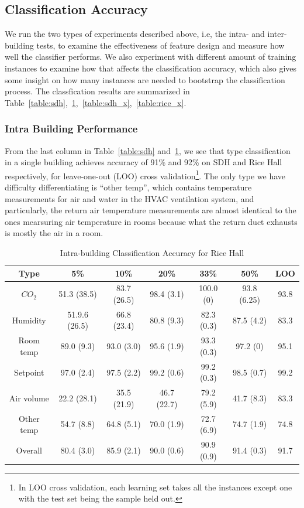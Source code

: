 \subsection{Classification Accuracy}
We run the two types of experiments described above, i.e, the intra- and inter- building tests, to examine the effectiveness of feature design and measure how well 
the classifier performs. We also experiment with different amount of training instances to examine how that affects the classification accuracy, which also gives 
some insight on how many instances are needed to bootstrap the classification process. The classfication results are summarized in Table~\ref{table:sdh},~\ref{table:rice},~\ref{table:sdh_x},~\ref{table:rice_x}.

\subsubsection{Intra Building Performance}
From the last column in Table~\ref{table:sdh} and~\ref{table:rice}, we see that type classification in a single building achieves accuracy of 91\% and 92\% on SDH and Rice Hall respectively, for leave-one-out (LOO) cross validation\footnote{In LOO cross validation, each learning set takes all the instances except one with the test set being the sample held out.}. The only type we have difficulty differentiating is ``other temp'', which contains temperature measurements for air and water in the HVAC ventilation system, and particularly, the return air temperature measurements are almost identical to the ones mearsuring air temperature in rooms because what the return duct exhausts is mostly the air in a room.

\begin{table}[ht!]
\caption{Intra-building Classification Accuracy for Rice Hall}
\centering %
\begin{tabular}{c | c | c | c | c | c | c}%
\hline %
Type & 5\% & 10\% & 20\% & 33\% & 50\% & LOO\\ %
\hline\hline %
$CO_{2}$ & 51.3 (38.5) & 83.7 (26.5) & 98.4 (3.1) & 100.0 (0) & 93.8 (6.25) & 93.8\\ \hline
Humidity & 51.9.6 (26.5) & 66.8 (23.4) & 80.8 (9.3) & 82.3 (0.3) & 87.5 (4.2) & 83.3\\ \hline
Room temp & 89.0 (9.3) & 93.0 (3.0) & 95.6 (1.9) & 93.3 (0.3) & 97.2 (0) & 95.1\\ \hline
Setpoint & 97.0 (2.4) & 97.5 (2.2) & 99.2 (0.6) & 99.2 (0.3) & 98.5 (0.7) & 99.2\\ \hline
Air volume & 22.2 (28.1) & 35.5 (21.9) & 46.7 (22.7) & 79.2 (5.9) & 41.7 (8.3) & 83.3\\ \hline
Other temp & 54.7 (8.8) & 64.8 (5.1) & 70.0 (1.9) & 72.7 (6.9) & 74.7 (1.9) & 74.8\\ \hline
Overall & 80.4 (3.0) & 85.9 (2.1) & 90.0 (0.6) & 90.9 (0.9) & 91.4 (0.3) & 91.7\\ \hline
\end{tabular}
\label{table:rice} %
\end{table}

